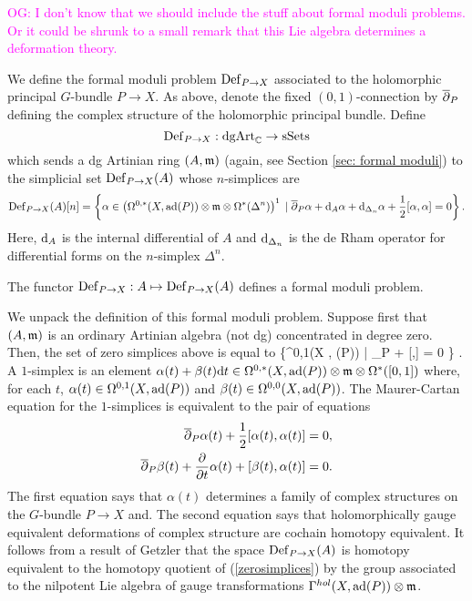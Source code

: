 \documentclass[10pt]{amsart}
\def\owen{\textcolor{magenta}{OG: }\textcolor{magenta}}
\begin{document}
\owen{I don't know that we should include the stuff about formal moduli problems. Or it could be shrunk to a small remark that this Lie algebra determines a deformation theory.}

We define the formal moduli problem ${\rm Def}_{P\to X}$ associated to the holomorphic principal $G$-bundle $P \to X$. 
As above, denote the fixed $(0,1)$-connection by $\overline{\partial}_P$ defining the complex structure of the holomorphic principal bundle. 
Define
\[
{\rm Def}_{P \to X} : {\rm dgArt}_\mathbb C \to {\rm sSets}
\]
which sends a dg Artinian ring $(A, {\mathfrak m})$ (again, see Section \ref{sec: formal moduli}) to the simplicial set ${\rm Def}_{P \to X}(A)$ whose $n$-simplices are
\[
{\rm Def}_{P \to X}(A) [n] = \left\{\alpha \in \left(\Omega^{0,*}(X , {\rm ad}(P)) \otimes {\mathfrak m} \otimes \Omega^*(\Delta^n)\right)^1  \;  | \; \overline{\partial}_P \alpha + {\rm d}_A \alpha + {\rm d}_{\Delta_n} \alpha + \frac{1}{2} [\alpha,\alpha] = 0\right\} .
\]
Here, ${\rm d}_A$ is the internal differential of $A$ and ${\rm d}_{\Delta_n}$ is the de Rham operator for differential forms on the $n$-simplex $\Delta^n$. 

\begin{lem}
The functor ${\rm Def}_{P \to X} : A \mapsto {\rm Def}_{P \to X}(A)$ defines a formal moduli problem.
\end{lem} 

We unpack the definition of this formal moduli problem.
Suppose first that $(A, {\mathfrak m})$ is an ordinary Artinian algebra (not dg) concentrated in degree zero. 
Then, the set of zero simplices above is equal to
\beqn\label{zerosimplices}
\{\alpha \in \Omega^{0,1}(X , \ad(P)) \tensor \fm \; | \; \dbar_P \alpha +  [\alpha,\alpha] = 0 \} .
\eeqn
A $1$-simplex is an element $\alpha(t) + \beta(t) {\rm d} t \in \Omega^{0,*}(X, {\rm ad}(P)) \otimes {\mathfrak m} \otimes \Omega^*([0,1])$ where, for each $t$, $\alpha(t) \in \Omega^{0,1}(X , {\rm ad}(P))$ and $\beta(t) \in \Omega^{0,0}(X, {\rm ad}(P))$.
The Maurer-Cartan equation for the $1$-simplices is equivalent to the pair of equations
\begin{align*}
\overline{\partial}_P \alpha(t) + \frac{1}{2}[\alpha(t), \alpha(t)] & = 0 ,\\
\overline{\partial}_P \beta(t) + \frac{\partial}{\partial t} \alpha(t) + [\beta(t), \alpha(t)] & = 0 .
\end{align*}
The first equation says that $\alpha(t)$ determines a family of complex structures on the $G$-bundle $P \to X$ and.
The second equation says that holomorphically gauge equivalent deformations of complex structure are cochain homotopy equivalent. 
It follows from a result of Getzler \cite{GetzlerLie} that the space ${\rm Def}_{P \to X}(A)$ is homotopy equivalent to the homotopy quotient of (\ref{zerosimplices}) by the group associated to the nilpotent Lie algebra of gauge transformations $\Gamma^{hol}(X, {\rm ad}(P)) \otimes {\mathfrak m}$. 
\end{document}
